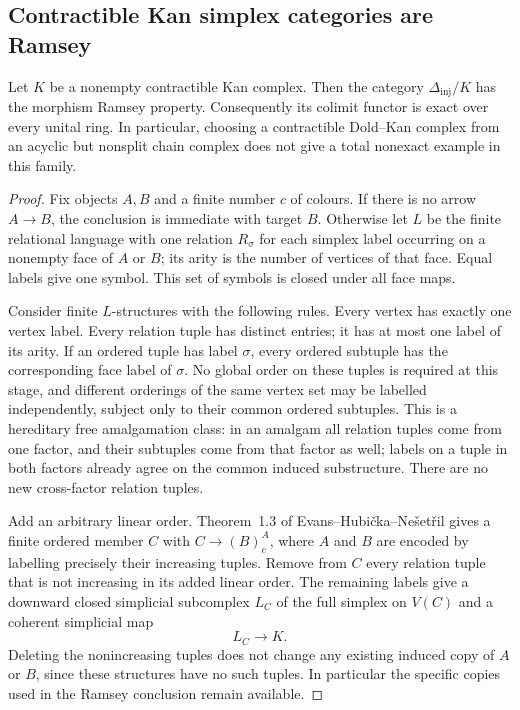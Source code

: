 \subsection{Contractible Kan simplex categories are Ramsey}
\begin{theorem}
\label{C4:contractible-kan-ramsey}
Let $K$ be a nonempty contractible Kan complex. Then the category
$\Delta_{\mathrm{inj}}/K$ has the morphism Ramsey property. Consequently
its colimit functor is exact over every unital ring. In particular,
choosing a contractible Dold--Kan complex from an acyclic but nonsplit
chain complex does not give a total nonexact example in this family.
\end{theorem}
\begin{proof}
Fix objects $A,B$ and a finite number $c$ of colours. If there is no
arrow $A\to B$, the conclusion is immediate with target $B$. Otherwise
let $L$ be the finite relational language with one relation $R_\sigma$
for each simplex label occurring on a nonempty face of $A$ or $B$;
its arity is the number of vertices of that face. Equal labels give
one symbol. This set of symbols is closed under all face maps.

Consider finite $L$-structures with the following rules. Every vertex
has exactly one vertex label. Every relation tuple has distinct
entries; it has at most one label of its arity. If an ordered tuple
has label $\sigma$, every ordered subtuple has the corresponding
face label of $\sigma$. No global order on these tuples is required
at this stage, and different orderings of the same vertex set may
be labelled independently, subject only to their common ordered
subtuples. This is a hereditary free amalgamation class: in an
amalgam all relation tuples come from one factor, and their subtuples
come from that factor as well; labels on a tuple in both factors
already agree on the common induced substructure. There are no new
cross-factor relation tuples.

Add an arbitrary linear order. Theorem~1.3 of
Evans--Hubi\v cka--Ne\v set\v ril \cite{D-EHN2021} gives a finite
ordered member $C$ with $C\longrightarrow(B)^A_c$, where $A$ and $B$
are encoded by labelling precisely their increasing tuples. Remove
from $C$ every relation tuple that is not increasing in its added
linear order. The remaining labels give a downward closed simplicial
subcomplex $L_C$ of the full simplex on $V(C)$ and a coherent
simplicial map
\[
 L_C\longrightarrow K.
\]
Deleting the nonincreasing tuples does not change any existing
induced copy of $A$ or $B$, since these structures have no such
tuples. In particular the specific copies used in the Ramsey
conclusion remain available.


\end{proof}
